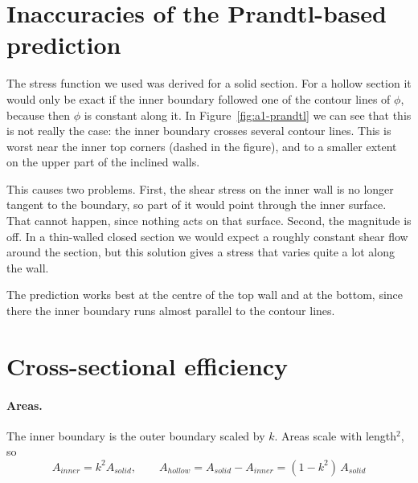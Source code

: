 \section{Inaccuracies of the Prandtl-based prediction}
\label{sec:a1-2}

The stress function we used was derived for a solid section. For a hollow section it would only be exact if the inner boundary followed one of the contour lines of $\phi$, because then $\phi$ is constant along it. In Figure~\ref{fig:a1-prandtl} we can see that this is not really the case: the inner boundary crosses several contour lines. This is worst near the inner top corners (dashed in the figure), and to a smaller extent on the upper part of the inclined walls.

This causes two problems. First, the shear stress on the inner wall is no longer tangent to the boundary, so part of it would point through the inner surface. That cannot happen, since nothing acts on that surface. Second, the magnitude is off. In a thin-walled closed section we would expect a roughly constant shear flow around the section, but this solution gives a stress that varies quite a lot along the wall.

The prediction works best at the centre of the top wall and at the bottom, since there the inner boundary runs almost parallel to the contour lines.


\section{Cross-sectional efficiency}
\label{sec:a1-3}

\paragraph{Areas.}
The inner boundary is the outer boundary scaled by $k$. Areas scale with length$^2$, so
\begin{equation}
    A_{inner} = k^2 A_{solid},
    \qquad
    A_{hollow} = A_{solid} - A_{inner} = (1-k^2)\,A_{solid}
\end{equation}

